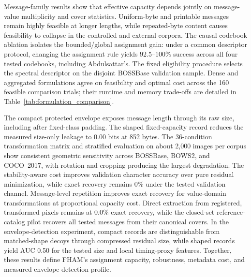 \documentclass[preprint,12pt]{elsarticle}
\theoremstyle{plain}
\begin{document}
Message-family results show that effective capacity depends jointly on
message-value multiplicity and cover statistics. Uniform-byte and printable
messages remain highly feasible at longer lengths, while repeated-byte content
causes feasibility to collapse in the controlled and external corpora. The
causal codebook ablation isolates the bounded/global assignment gain: under a
common descriptor protocol, changing the assignment rule yields 92.5--100\%
success across all four tested codebooks, including Abdulsattar's. The fixed
eligibility procedure selects the spectral descriptor on the disjoint
BOSSBase validation sample. Dense and aggregated formulations agree on
feasibility and optimal cost across the 160 feasible comparison trials; their
runtime and memory trade-offs are detailed in Table~\ref{tab:formulation_comparison}.

The compact protected envelope exposes message length through its raw size,
including after fixed-class padding. The shaped fixed-capacity record reduces
the measured size-only leakage to 0.00 bits at 852 bytes. The 36-condition
transformation matrix and stratified evaluation on about 2,000 images per
corpus show consistent geometric sensitivity across BOSSBase, BOWS2, and
COCO~2017, with rotation and cropping producing the largest degradation. The
stability-aware cost improves validation character accuracy over pure residual
minimization, while exact recovery remains 0\% under the tested validation
channel. Message-level repetition improves exact recovery for value-domain
transformations at proportional capacity cost. Direct extraction from
registered, transformed pixels remains at 0.0\% exact recovery, while the
closed-set reference-catalog pilot recovers all tested messages from their
canonical covers. In the envelope-detection experiment, compact records are
distinguishable from matched-shape decoys through compressed residual size,
while shaped records yield AUC 0.50 for the tested size and local timing-proxy
features. Together, these results define FHAM's assignment capacity,
robustness, metadata cost, and measured envelope-detection profile.
\end{document}
